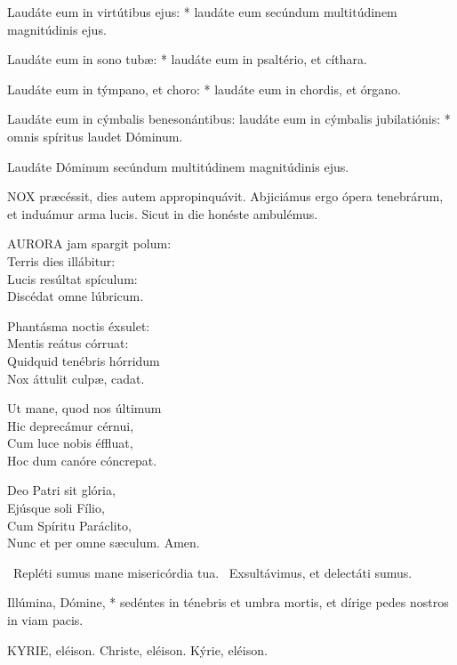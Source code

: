 Laudáte eum in virtútibus ejus: * laudáte eum secúndum multitúdinem magnitúdinis ejus.

Laudáte eum in sono tubæ: * laudáte eum in psaltério, et cíthara.

Laudáte eum in týmpano, et choro: * laudáte eum in chordis, et órgano.

Laudáte eum in cýmbalis benesonántibus: laudáte eum in cýmbalis jubilatiónis: * omnis spíritus laudet Dóminum.

 Laudáte Dóminum secúndum multitúdinem magnitúdinis ejus.


\lettrine[lines=2]{N}{OX} præcéssit, dies autem appropinquávit. Abjiciámus ergo ópera tenebrárum, et induámur arma lucis. Sicut in die honéste ambulémus.


\lettrine[lines=2]{A}{URORA} jam spargit polum:\\
Terris dies illábitur:\\
Lucis resúltat spículum:\\
Discédat omne lúbricum.

Phantásma noctis éxsulet:\\
Mentis reátus córruat:\\
Quidquid tenébris hórridum\\
Nox áttulit culpæ, cadat.

Ut mane, quod nos últimum\\
Hic deprecámur cérnui,\\
Cum luce nobis éffluat,\\
Hoc dum canóre cóncrepat.

Deo Patri sit glória,\\
Ejúsque soli Fílio,\\
Cum Spíritu Paráclito,\\
Nunc et per omne sæculum. Amen.

\V\ Repléti sumus mane misericórdia tua. \R\ Exsultávimus, et delectáti sumus.

 Illúmina, Dómine, * sedéntes in ténebris et umbra mortis, et dírige pedes nostros in viam pacis.



KYRIE, eléison. Christe, eléison. Kýrie, eléison.

